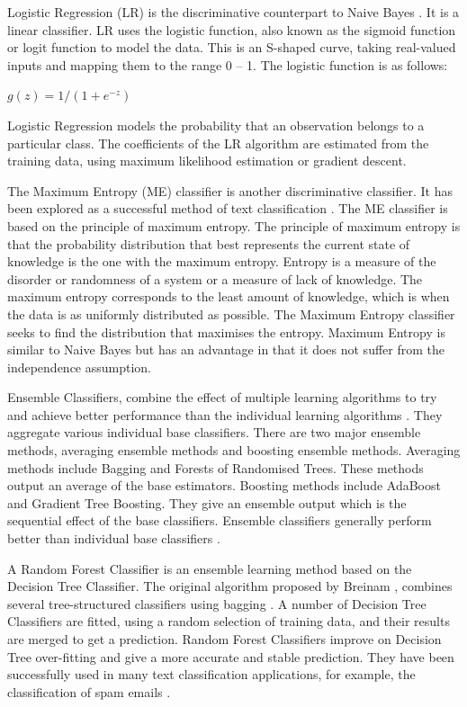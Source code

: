 Logistic Regression (LR) is the discriminative counterpart to Naive Bayes \cite{ng2002discriminative}. It is a linear classifier. LR uses the logistic function, also known as the sigmoid function or logit function to model the data. This is an S-shaped curve, taking real-valued inputs and mapping them to the range 0 – 1. The logistic function is as follows:

\begin{center}
    \(g(z)=1/(1+e^{-z})\)
\end{center}

Logistic Regression models the probability that an observation belongs to a particular class. The coefficients of the LR algorithm are estimated from the training data, using maximum likelihood estimation or gradient descent.

The Maximum Entropy (ME) classifier is another discriminative classifier. It has been explored as a successful method of text classification \cite{MaxEnt1999}. The ME classifier is based on the principle of maximum entropy. The principle of maximum entropy is that the probability distribution that best represents the current state of knowledge is the one with the maximum entropy. Entropy is a measure of the disorder or randomness of a system or a measure of lack of knowledge. The maximum entropy corresponds to the least amount of knowledge, which is when the data is as uniformly distributed as possible. The Maximum Entropy classifier seeks to find the distribution that maximises the entropy. Maximum Entropy is similar to Naive Bayes but has an advantage in that it does not suffer from the independence assumption.

Ensemble Classifiers, combine the effect of multiple learning algorithms to try and achieve better performance than the individual learning algorithms \cite{dietterich2000ensemble}. They aggregate various individual base classifiers. There are two major ensemble methods, averaging ensemble methods and boosting ensemble methods. Averaging methods include Bagging and Forests of Randomised Trees. These methods output an average of the base estimators. Boosting methods include AdaBoost and Gradient Tree Boosting. They give an ensemble output which is the sequential effect of the base classifiers. Ensemble classifiers generally perform better than individual base classifiers \cite{Opitz1999}. 

A Random Forest Classifier is an ensemble learning method based on the Decision Tree Classifier. The original algorithm proposed by Breinam \cite{Breiman2001}, combines several tree-structured classifiers using bagging \cite{breiman1996bagging}. A number of Decision Tree Classifiers are fitted, using a random selection of training data, and their results are merged to get a prediction. Random Forest Classifiers improve on Decision Tree over-fitting and give a more accurate and stable prediction. They have been successfully used in many text classification applications, for example, the classification of spam emails \cite{akinyelu2014}.

